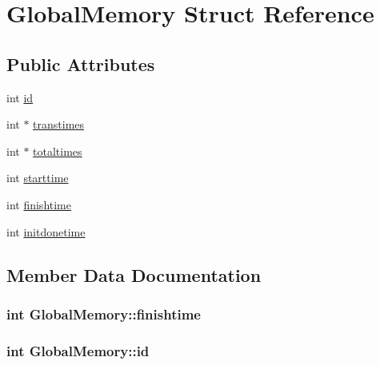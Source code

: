 \hypertarget{structGlobalMemory}{}\section{Global\+Memory Struct Reference}
\label{structGlobalMemory}
\subsection*{Public Attributes}
\begin{DoxyCompactItemize}
\item 
int \hyperlink{structGlobalMemory_a83c470a5d1c175f7a1acf1b9e3d88f38}{id}
\item 
int $\ast$ \hyperlink{structGlobalMemory_a20ef09094978064a7a728f19746beba0}{transtimes}
\item 
int $\ast$ \hyperlink{structGlobalMemory_a65cad0bb3e74fa2529bf6d05970826e8}{totaltimes}
\item 
int \hyperlink{structGlobalMemory_acdb6d13712d999b9d0ee2699ae8e6742}{starttime}
\item 
int \hyperlink{structGlobalMemory_aea82d496e0ad8bd119115aa20339bde1}{finishtime}
\item 
int \hyperlink{structGlobalMemory_af5a01bd3e84a9eded90836059a8c8265}{initdonetime}
\end{DoxyCompactItemize}


\subsection{Member Data Documentation}
\hypertarget{structGlobalMemory_aea82d496e0ad8bd119115aa20339bde1}{}
\subsubsection[{finishtime}]{\setlength{\rightskip}{0pt plus 5cm}int Global\+Memory\+::finishtime}\label{structGlobalMemory_aea82d496e0ad8bd119115aa20339bde1}
\hypertarget{structGlobalMemory_a83c470a5d1c175f7a1acf1b9e3d88f38}{}
\subsubsection[{id}]{\setlength{\rightskip}{0pt plus 5cm}int Global\+Memory\+::id}\label{structGlobalMemory_a83c470a5d1c175f7a1acf1b9e3d88f38}
\hypertarget{structGlobalMemory_af5a01bd3e84a9eded90836059a8c8265}{}
